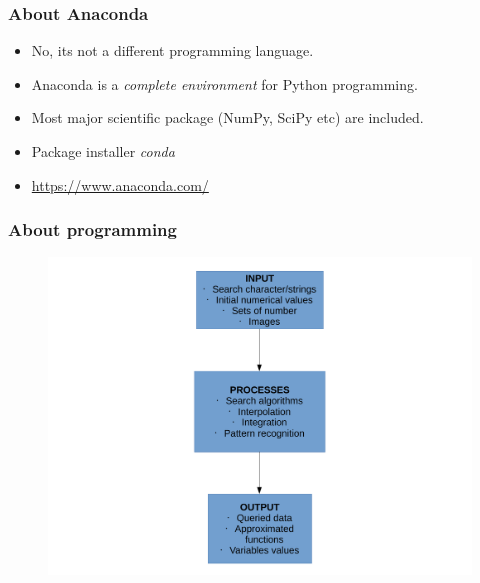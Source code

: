 \begin{frame}
\frametitle{About Anaconda}
\begin{itemize}
\item No, its not a different programming language.
\item Anaconda is a \emph{complete environment} for Python programming.
\item Most major scientific package (NumPy, SciPy etc) are included.
\item Package installer \emph{conda}

\item \url{https://www.anaconda.com/}
\end{itemize}

\end{frame}
\begin{frame}[fragile]
\frametitle{About programming}
\begin{figure}
\includegraphics[width=0.8\linewidth]{ProgrammingFlow.pdf}
\end{figure}
\end{frame}

